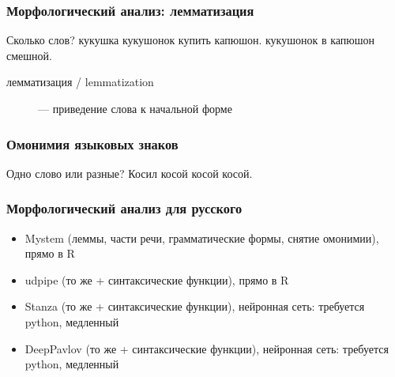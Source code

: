 \documentclass[svgnames]{beamer}
\begin{document}


\begin{frame}
  \frametitle{Морфологический анализ: лемматизация}
  \LARGE
  \begin{block}{Сколько слов?}
    кукушка кукушонок купить капюшон. кукушонок в капюшон смешной.
  \end{block}

\hrulefill\normalsize
  \begin{description}
  \item[лемматизация / lemmatization] — приведение слова к начальной форме
  \end{description}
\end{frame}


\begin{frame}
  \frametitle{Омонимия языковых знаков}
  \LARGE
  \begin{block}{Одно слово или разные?}
    Косил \alert<1>{косой косой косой}.
  \end{block}
\end{frame}

\begin{frame}
  \frametitle{Морфологический анализ для русского}
  \begin{itemize}
  \item Mystem (леммы, части речи, грамматические формы, снятие
    омонимии), прямо в R
  \item udpipe (то же + синтаксические функции), прямо в R
  \item Stanza (то же + синтаксические функции), нейронная сеть: требуется python, медленный
  \item DeepPavlov (то же + синтаксические функции), нейронная сеть: требуется python, медленный
  \end{itemize}
\end{frame}
\end{document}
